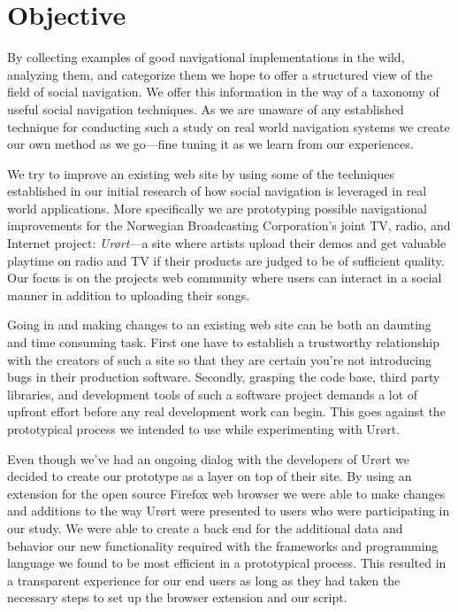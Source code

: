 \section{Objective}

By collecting examples of good navigational implementations in the wild,
analyzing them, and categorize them we hope to offer a structured view of the
field of social navigation. We offer this information in the way of a taxonomy
of useful social navigation techniques.
As we are unaware of any established technique for
conducting such a study on real world navigation systems we create our own
method as we go---fine tuning it as we learn from our experiences.

We try to improve an existing web site by using some of the techniques
established in our initial research of how social navigation is leveraged
in real world applications. More specifically we are prototyping possible
navigational improvements for the Norwegian Broadcasting Corporation's joint
TV, radio, and Internet project: \emph{Ur\o{}rt}---a site where artists upload
their demos and get valuable playtime on radio and TV if their products are
judged to be of sufficient quality. Our focus is on the projects
web community where users can
interact in a social manner in addition to uploading their songs.

Going in and making changes to an existing web site can be both an
daunting and time consuming task. First one have to establish a trustworthy
relationship with the creators of such a site so that they are certain
you're not introducing bugs in their production software. Secondly, grasping the
code base, third party libraries, and development tools of such a software
project demands a lot of upfront effort before any real development work can
begin. This goes against the prototypical process we intended to use while
experimenting with Ur\o{}rt.

Even though we've had an ongoing dialog with the developers of Ur\o{}rt we
decided to create our prototype as a layer on top of their site. By using an
extension%
\sidefill%
 for the open source Firefox%
web browser we were able to make changes and additions to the way Ur\o{}rt were
presented to users who were participating in our study. We were able to create
a back end for the additional data and behavior our new functionality required
with the frameworks and programming language we found to be most efficient in
a prototypical process. This resulted in a transparent experience for our end
users as long as they had taken the necessary steps to set up the browser
extension and our script.

